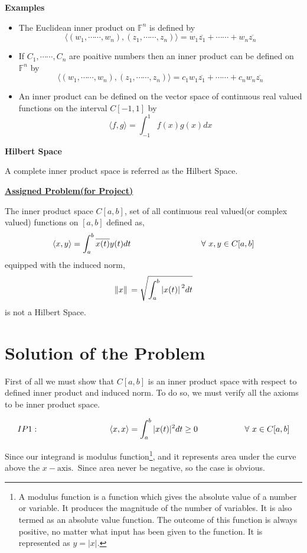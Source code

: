 \documentclass[12pt, a4paper]{article} %
\begin{document}
{\bf Examples}

\begin{itemize}
    \item The Euclidean inner product on $\mathbb{F}^n$ is defined by \[\langle\left(w_1, \cdots \cdots , w_n\right), \left(z_1, \cdots \cdots, z_n\right)\rangle = w_1\overline{z_1} + \cdots \cdots + w_n \overline{z_n}\]
    \item If $C_1, \cdots \cdots, C_n$ are poaitive numbers then an inner product can be defined on $\mathbb{F}^n$ by         \[\langle \left(w_1, \cdots \cdots , w_n\right), \left(z_1, \cdots \cdots, z_n\right)\rangle = c_1 w_1\overline{z_1} + \cdots \cdots + c_n w_n \overline{z_n}\]
    \item An inner product can be defined on the vector space of continuous real valued functions on the interval $C[-1,1]$ by \[\langle f, g \rangle = \int_{-1}^{1} f(x) g(x) dx\]

\end{itemize}

{\bf Hilbert Space}

A complete inner product space is referred as the Hilbert Space.

\pagebreak

{\bf \large \underline{Assigned Problem(for Project)}}

The inner product space $C[a,b]$, set of all continuous real valued(or complex valued) functions on $[a,b]$ defined as,
        \[\langle x,y \rangle = \int_{a}^{b} \overline{x(t)}y(t) dt \hspace*{3cm} \forall\  x,y \in C[a,b]\] equipped with the induced norm, 
        \[\norm*{x} = \sqrt{\int_{a}^{b}\abs*{x(t)}^2 dt}\]
        is not a Hilbert Space.

\section{Solution of the Problem}  

    First of all we must show that $C[a,b]$ is an inner product space with respect to defined inner product and induced norm.
    To do so, we must verify all the axioms to be inner product space. 

    \[IP1:\hspace*{3cm} \langle x, x \rangle = \int_{a}^{b}|x(t)|^2 dt \geq 0\hspace*{2cm} \forall\ x\in C[a,b]\]

    
    Since our integrand is modulus function\footnote{A modulus function is a function which gives the absolute value of a number or variable. It produces the magnitude of the number of variables. It is also termed as an absolute value function. The outcome of this function is always positive, no matter what input has been given to the function. It is represented as $y = |x|$.}, and it represents area under the curve above the $x-\mbox{axis}$.\ Since area never be negative, so the case is obvious.
    
\end{document}
